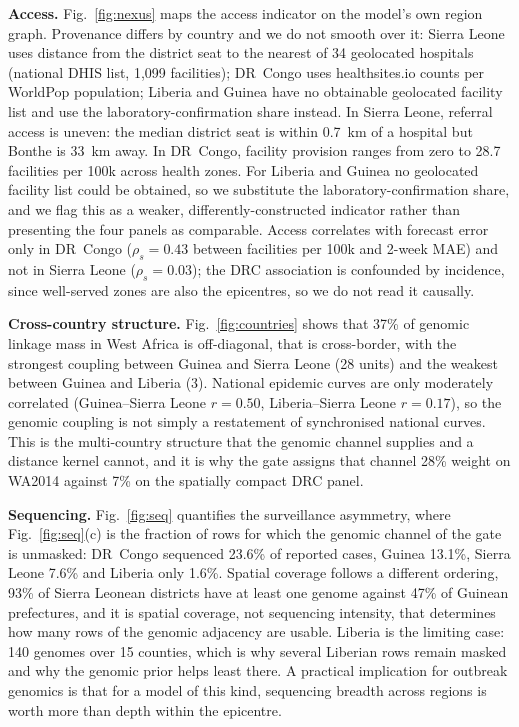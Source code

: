 \documentclass[conference]{IEEEtran}
\begin{document}
\textbf{Access.} Fig.~\ref{fig:nexus} maps the access indicator on the model's own region graph. Provenance differs by country and we do not smooth over it: Sierra Leone uses distance from the district seat to the nearest of 34 geolocated hospitals (national DHIS list, 1{,}099 facilities); DR~Congo uses healthsites.io counts per WorldPop population; Liberia and Guinea have no obtainable geolocated facility list and use the laboratory-confirmation share instead. In Sierra Leone, referral access is uneven: the median district seat is within \SI{0.7}{km} of a hospital but Bonthe is \SI{33}{km} away. In DR~Congo, facility provision ranges from zero to 28.7 facilities per 100k across health zones. For Liberia and Guinea no geolocated facility list could be obtained, so we substitute the laboratory-confirmation share, and we flag this as a weaker, differently-constructed indicator rather than presenting the four panels as comparable. Access correlates with forecast error only in DR~Congo ($\rho_s=0.43$ between facilities per 100k and 2-week MAE) and not in Sierra Leone ($\rho_s=0.03$); the DRC association is confounded by incidence, since well-served zones are also the epicentres, so we do not read it causally.

\textbf{Cross-country structure.} Fig.~\ref{fig:countries} shows that 37\% of genomic linkage mass in West Africa is off-diagonal, that is cross-border, with the strongest coupling between Guinea and Sierra Leone (28 units) and the weakest between Guinea and Liberia (3). National epidemic curves are only moderately correlated (Guinea--Sierra Leone $r=0.50$, Liberia--Sierra Leone $r=0.17$), so the genomic coupling is not simply a restatement of synchronised national curves. This is the multi-country structure that the genomic channel supplies and a distance kernel cannot, and it is why the gate assigns that channel 28\% weight on WA2014 against 7\% on the spatially compact DRC panel.

\textbf{Sequencing.} Fig.~\ref{fig:seq} quantifies the surveillance asymmetry, where Fig.~\ref{fig:seq}(c) is the fraction of rows for which the genomic channel of the gate is unmasked: DR~Congo sequenced 23.6\% of reported cases, Guinea 13.1\%, Sierra Leone 7.6\% and Liberia only 1.6\%. Spatial coverage follows a different ordering, 93\% of Sierra Leonean districts have at least one genome against 47\% of Guinean prefectures, and it is spatial coverage, not sequencing intensity, that determines how many rows of the genomic adjacency are usable. Liberia is the limiting case: 140 genomes over 15 counties, which is why several Liberian rows remain masked and why the genomic prior helps least there. A practical implication for outbreak genomics is that for a model of this kind, sequencing breadth across regions is worth more than depth within the epicentre.
\end{document}
